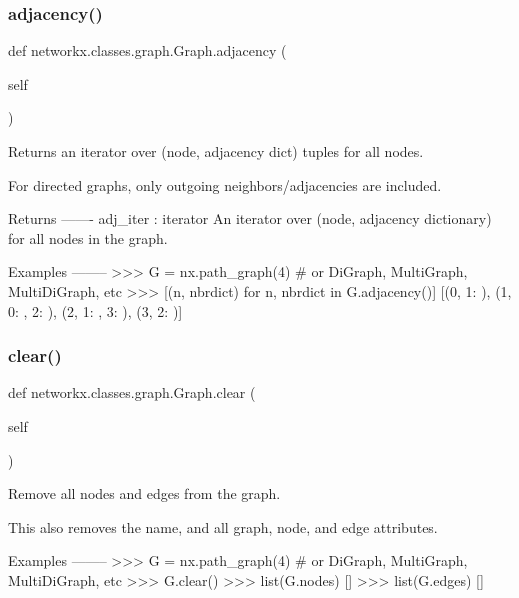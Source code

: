 \subsubsection{\texorpdfstring{adjacency()}{adjacency()}}
{\footnotesize\ttfamily def networkx.\+classes.\+graph.\+Graph.\+adjacency (\begin{DoxyParamCaption}\item[{}]{self }\end{DoxyParamCaption})}

\begin{DoxyVerb}Returns an iterator over (node, adjacency dict) tuples for all nodes.

For directed graphs, only outgoing neighbors/adjacencies are included.

Returns
-------
adj_iter : iterator
   An iterator over (node, adjacency dictionary) for all nodes in
   the graph.

Examples
--------
>>> G = nx.path_graph(4)  # or DiGraph, MultiGraph, MultiDiGraph, etc
>>> [(n, nbrdict) for n, nbrdict in G.adjacency()]
[(0, {1: {}}), (1, {0: {}, 2: {}}), (2, {1: {}, 3: {}}), (3, {2: {}})]\end{DoxyVerb}
 \mbox{\label{classnetworkx_1_1classes_1_1graph_1_1Graph_aabafdb4a4bbef0e488fc3a18b5f4fb4f}} 
\subsubsection{\texorpdfstring{clear()}{clear()}}
{\footnotesize\ttfamily def networkx.\+classes.\+graph.\+Graph.\+clear (\begin{DoxyParamCaption}\item[{}]{self }\end{DoxyParamCaption})}

\begin{DoxyVerb}Remove all nodes and edges from the graph.

This also removes the name, and all graph, node, and edge attributes.

Examples
--------
>>> G = nx.path_graph(4)  # or DiGraph, MultiGraph, MultiDiGraph, etc
>>> G.clear()
>>> list(G.nodes)
[]
>>> list(G.edges)
[]\end{DoxyVerb}
 \mbox{\label{classnetworkx_1_1classes_1_1graph_1_1Graph_aa689153e9174c132ce6beb9289c11119}} 
